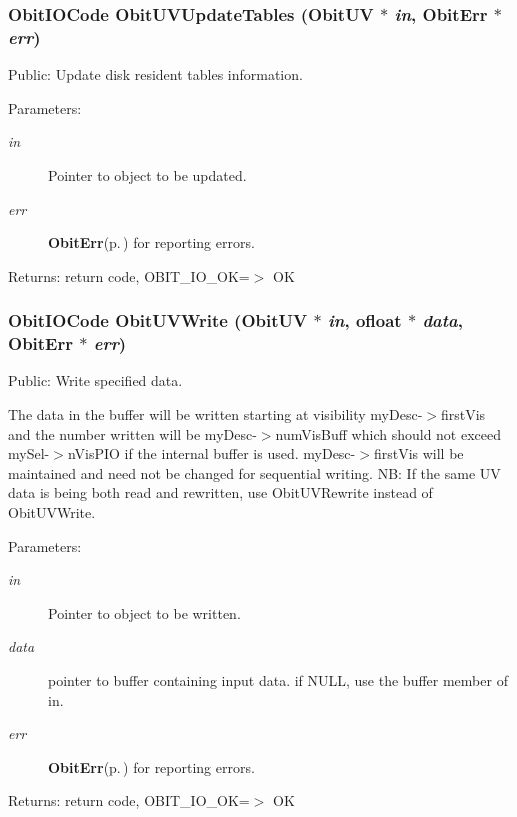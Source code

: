 \subsubsection{\setlength{\rightskip}{0pt plus 5cm}Obit\-IOCode Obit\-UVUpdate\-Tables ({\bf Obit\-UV} $\ast$ {\em in}, {\bf Obit\-Err} $\ast$ {\em err})}\label{ObitUV_8c_a33}


Public: Update disk resident tables information. 

\begin{Desc}
\item[Parameters:]
\begin{description}
\item[{\em in}]Pointer to object to be updated. \item[{\em err}]{\bf Obit\-Err}{\rm (p.\,\pageref{structObitErr})} for reporting errors. \end{description}
\end{Desc}
\begin{Desc}
\item[Returns:]return code, OBIT\_\-IO\_\-OK=$>$ OK \end{Desc}
\subsubsection{\setlength{\rightskip}{0pt plus 5cm}Obit\-IOCode Obit\-UVWrite ({\bf Obit\-UV} $\ast$ {\em in}, {\bf ofloat} $\ast$ {\em data}, {\bf Obit\-Err} $\ast$ {\em err})}\label{ObitUV_8c_a28}


Public: Write specified data. 

The data in the buffer will be written starting at visibility my\-Desc-$>$first\-Vis and the number written will be my\-Desc-$>$num\-Vis\-Buff which should not exceed my\-Sel-$>$n\-Vis\-PIO if the internal buffer is used. my\-Desc-$>$first\-Vis will be maintained and need not be changed for sequential writing. NB: If the same UV data is being both read and rewritten, use Obit\-UVRewrite instead of Obit\-UVWrite. \begin{Desc}
\item[Parameters:]
\begin{description}
\item[{\em in}]Pointer to object to be written. \item[{\em data}]pointer to buffer containing input data. if NULL, use the buffer member of in. \item[{\em err}]{\bf Obit\-Err}{\rm (p.\,\pageref{structObitErr})} for reporting errors. \end{description}
\end{Desc}
\begin{Desc}
\item[Returns:]return code, OBIT\_\-IO\_\-OK=$>$ OK \end{Desc}
